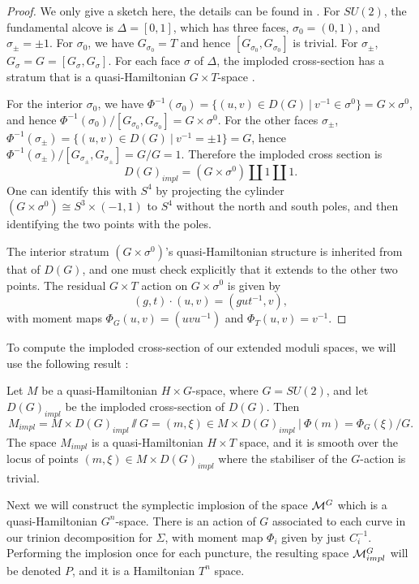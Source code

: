 	\begin{proof}
		We only give a sketch here, the details can be found in \cite[Prop 2.29]{hurtubise_representations_2000}. For $SU(2)$, the fundamental alcove is $\Delta = [0,1]$, which has three faces, $\sigma_0 = (0,1)$, and $\sigma_{\pm} = \pm1$. For $\sigma_0$, we have $G_{\sigma_0} = T$ and hence $[G_{\sigma_0}, G_{\sigma_0}]$ is trivial. For $\sigma_\pm$, $G_\sigma = G = [G_\sigma,G_\sigma]$. For each face $\sigma$ of $\Delta$, the imploded cross-section has a stratum that is a quasi-Hamiltonian $G\times T$-space \cite[Theorem 5.1]{alekseev_lie_1998}.
		
		For the interior $\sigma_0$, we have $\Phi^{-1}(\sigma_0) = \{(u,v)\in D(G)~|~ v^{-1}\in \sigma^0\} = G \times \sigma^0$, and hence $\Phi^{-1}(\sigma_0)/[G_{\sigma_0},G_{\sigma_0}] = G\times \sigma^0$. For the other faces $\sigma_{\pm}$, $\Phi^{-1}(\sigma_\pm) = \{(u,v)\in D(G)~|~ v^{-1} = \pm 1\} = G$, hence $\Phi^{-1}(\sigma_\pm)/[G_{\sigma_\pm},G_{\sigma_\pm}] = G/G = 1$. Therefore the imploded cross section is
		\begin{equation}
			D(G)_{impl} = (G\times \sigma^0) \coprod {1} \coprod {1}.
		\end{equation}
		One can identify this with $S^4$ by projecting the cylinder $(G\times \sigma^0) \cong S^3\times (-1,1)$ to $S^4$ without the north and south poles, and then identifying the two points with the poles. 
		
		The interior stratum $(G\times \sigma^0)$'s quasi-Hamiltonian structure is inherited from that of $D(G)$, and one must check explicitly that it extends to the other two points. The residual $G\times T$ action on $G\times \sigma^0$ is given by
		\begin{equation}
			(g,t)\cdot (u,v) = (gut^{-1},v),
		\end{equation}
		with moment maps $\Phi_G(u,v) = (uvu^{-1})$ and $\Phi_T(u,v) = v^{-1}$.
	\end{proof}
	To compute the imploded cross-section of our extended moduli spaces, we will use the following result \cite[Prop 2.32]{hurtubise_representations_2000}:
	\begin{theorem}
		Let $M$ be a quasi-Hamiltonian $H\times G$-space, where $G=SU(2)$, and let $D(G)_{impl}$ be the imploded cross-section of $D(G)$. Then
		\begin{equation}
			M_{impl} = M\times D(G)_{impl}\sslash G = {(m,\xi)\in M\times D(G)_{impl}~|~\Phi(m)=\Phi_G(\xi)}/G.
		\end{equation}
		The space $M_{impl}$ is a quasi-Hamiltonian $H\times T$ space, and it is smooth over the locus of points $(m,\xi)\in M\times D(G)_{impl}$ where the stabiliser of the $G$-action is trivial.
	\end{theorem}
	Next we will construct the symplectic implosion of the space $\mathcal{M}^G$ which is a quasi-Hamiltonian $G^n$-space. There is an action of $G$ associated to each curve in our trinion decomposition for $\Sigma$, with moment map $\Phi_i$ given by just $C_i^{-1}$. Performing the implosion once for each puncture, the resulting space $\mathcal{M}^G_{impl}$ will be denoted $P$, and it is a Hamiltonian $T^n$ space.
	
